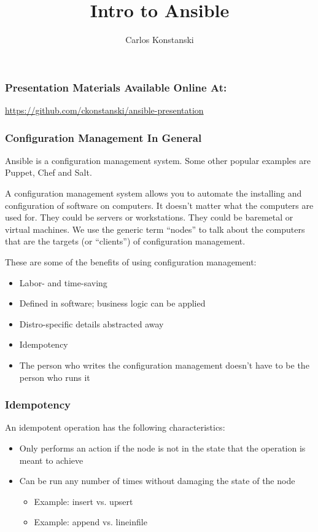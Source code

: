 \documentclass[helvetica,english,utf8,notitle,nologo]{beamer}
\begin{document}
\title{Intro to Ansible}
\author{Carlos Konstanski}

\frame{\titlepage}

\begin{frame}
  \frametitle{Presentation Materials Available Online At:}
  \href{url}{https://github.com/ckonstanski/ansible-presentation}
\end{frame}



\begin{frame}
  \frametitle{Configuration Management In General}

  Ansible is a configuration management system. Some other popular
  examples are Puppet, Chef and Salt.

  A configuration management system allows you to automate the
  installing and configuration of software on computers. It doesn't
  matter what the computers are used for. They could be servers or
  workstations. They could be baremetal or virtual machines. We use
  the generic term ``nodes'' to talk about the computers that are the
  targets (or ``clients'') of configuration management.

  These are some of the benefits of using configuration management:

  \begin{itemize}
  \item Labor- and time-saving
  \item Defined in software; business logic can be applied
  \item Distro-specific details abstracted away
  \item Idempotency
  \item The person who writes the configuration management doesn't
    have to be the person who runs it
  \end{itemize}
\end{frame}

\begin{frame}
  \frametitle{Idempotency}

  An idempotent operation has the following characteristics:

  \begin{itemize}
  \item Only performs an action if the node is not in the state that
    the operation is meant to achieve
  \item Can be run any number of times without damaging the state of
    the node
    \begin{itemize}
    \item Example: insert vs. upsert
    \item Example: append vs. lineinfile
    \end{itemize}
  \end{itemize}
\end{frame}
\end{document}
